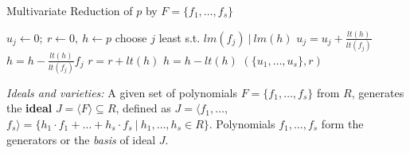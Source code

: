 {\small
\begin{algorithm}[hbt]
 \caption{Multivariate Reduction of $p$ by $F=\{f_1,\dots,f_s\}$}
 \label{algo:mv_reduce}
 \begin{algorithmic}[1]
 \State $u_j \gets 0; ~r \gets 0, ~h \gets p $ 
 \State choose $j$ least s.t. $lm(f_j) ~|~ lm(h)$
 \State $u_j = u_j + \frac{lt(h)}{lt(f_j)}$
 \State $h = h - \frac{lt(h)}{lt(f_j)} f_j$
 \Else
 \State $r = r+ lt(h)$
 \State $h = h - lt(h)$
 \EndIf
 \EndWhile
 \State \Return $(\{u_1,\dots,u_s\} , r)$
 \EndProcedure
 \end{algorithmic}
 \end{algorithm}
}



{\it Ideals and varieties:} A given set of polynomials 
$F=\{f_1,\dots,f_s\}$ from $R$, generates the {\bf ideal} $J = \langle
F \rangle \subseteq R$, defined as $J = \langle f_1,\dots,$ $ f_s \rangle = \{
h_1\cdot f_1 + \dots+h_s\cdot f_s~|~h_1,\dots,h_s\in R\}$. 
Polynomials $f_1,\dots,f_s$ form the generators or the {\it basis} of ideal $J$.



